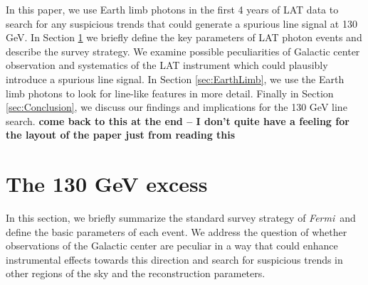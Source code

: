 \documentclass[aps,twocolumn,prd,superscriptaddress,showpacs,nofootinbib,fixfloat]{revtex4}
\newcommand{\Fermi}{{\slshape Fermi}}
\newcommand\Refsec[1]{Section \ref{sec:#1}}
\begin{document}
In this paper, we use Earth limb photons in the first 4
years of LAT data to search for any suspicious trends that
could generate a spurious line signal at 130 GeV.  In
\Refsec{130GeV} we briefly define the key parameters of LAT
photon events and describe the survey strategy. We examine
possible peculiarities of Galactic center observation and
systematics of the LAT instrument which could plausibly
introduce a spurious line signal. In \Refsec{EarthLimb}, we
use the Earth limb photons to look for line-like features in
more detail.  Finally in \Refsec{Conclusion}, we discuss our
findings and implications for the 130 GeV line search.  {\bf
come back to this at the end -- I don't quite have a feeling
for the layout of the paper just from reading this}



\section{The 130 GeV excess}
\label{sec:130GeV}
In this section, we briefly summarize the standard survey strategy of \Fermi\ 
and define the basic parameters of each event.  We
address the question of whether observations of the Galactic center
are peculiar in a way that could enhance instrumental
effects towards this direction and search for suspicious trends in
other regions of the sky and the reconstruction parameters.

\end{document}

